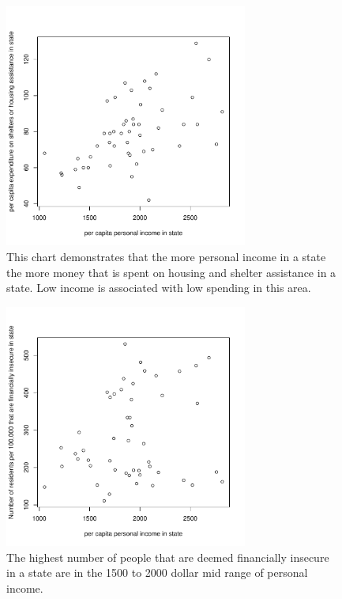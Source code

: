 \documentclass[12pt,letterpaper]{article}
\begin{document}
\begin{figure}[htp]
    \centering
    \includegraphics[width=8cm]{X1 Y Graph.pdf}
    \caption{This chart demonstrates that the more personal income in a state the more money that is spent on housing and shelter assistance in a state. Low income is associated with low spending in this area.}
    \label{X1, Y}
\end{figure}

\begin{figure}[htp]
    \centering
    \includegraphics[width=8cm]{X1, X2 Graph.pdf}
    \caption{The highest number of people that are deemed financially insecure in a state are in the 1500 to 2000 dollar mid range of personal income.
}
    \label{X1, X2}
\end{figure}
\end{document}
